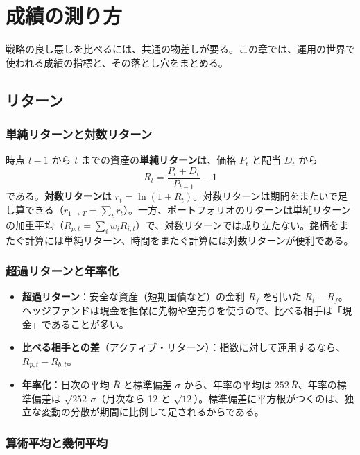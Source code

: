 \chapter{成績の測り方}
\label{ch:perf}

戦略の良し悪しを比べるには、共通の物差しが要る。この章では、運用の世界で使われる成績の指標と、その落とし穴をまとめる。

\section{リターン}

\subsection{単純リターンと対数リターン}

時点 $t-1$ から $t$ までの資産の\textbf{単純リターン}は、価格 $P_t$ と配当 $D_t$ から
\begin{equation}
R_t = \frac{P_t + D_t}{P_{t-1}} - 1
\end{equation}
である。\textbf{対数リターン}は $r_t = \ln(1+R_t)$。対数リターンは期間をまたいで足し算できる（$r_{1\to T} = \sum_t r_t$）。一方、ポートフォリオのリターンは単純リターンの加重平均（$R_{p,t} = \sum_i w_i R_{i,t}$）で、対数リターンでは成り立たない。銘柄をまたぐ計算には単純リターン、時間をまたぐ計算には対数リターンが便利である。

\subsection{超過リターンと年率化}

\begin{itemize}
\item \textbf{超過リターン}：安全な資産（短期国債など）の金利 $R_f$ を引いた $R_t - R_f$。ヘッジファンドは現金を担保に先物や空売りを使うので、比べる相手は「現金」であることが多い。
\item \textbf{比べる相手との差}（アクティブ・リターン）：指数に対して運用するなら、$R_{p,t} - R_{b,t}$。
\item \textbf{年率化}：日次の平均 $\bar R$ と標準偏差 $\sigma$ から、年率の平均は $252\,\bar R$、年率の標準偏差は $\sqrt{252}\,\sigma$（月次なら 12 と $\sqrt{12}$）。標準偏差に平方根がつくのは、独立な変動の分散が期間に比例して足されるからである。
\end{itemize}

\subsection{算術平均と幾何平均}

